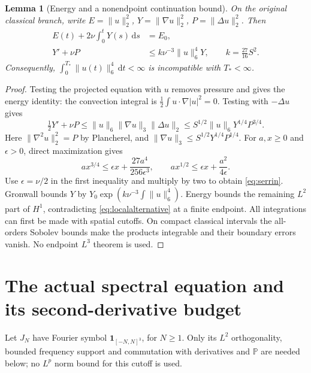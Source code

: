 \documentclass[11pt,a4paper]{article}
\newtheorem{lemma}[theorem]{Lemma}
\theoremstyle{definition}\newtheorem{definition}[theorem]{Definition}
\theoremstyle{remark}\newtheorem{remark}[theorem]{Remark}
\newcommand{\PP}{\mathbb P}
\newcommand{\dd}{\,\mathrm d}
\newcommand{\norm}[1]{\lVert #1\rVert}
\numberwithin{equation}{section}
\begin{document}
\begin{lemma}[Energy and a nonendpoint continuation bound]\label{lem:energyserrin}
On the original classical branch, write $E=\norm u_2^2$, $Y=\norm{\nabla u}_2^2$, $P=\norm{\Delta u}_2^2$. Then
\begin{align}
 E(t)+2\nu\int_0^tY(s)\dd s&=E_0,\label{eq:energy}\\
 Y'+\nu P&\le k\nu^{-3}\norm u_6^4Y,
 \qquad k=\frac{27}{16}S^2.\label{eq:serrin}
\end{align}
Consequently, $\int_0^{T_*}\norm{u(t)}_6^4\dd t<\infty$ is incompatible with $T_*<\infty$.
\end{lemma}
\begin{proof}
Testing the projected equation with $u$ removes pressure and gives the energy identity: the convection integral is $\frac12\int u\cdot\nabla|u|^2=0$. Testing with $-\Delta u$ gives
\[
 \tfrac12Y'+\nu P
 \le\norm u_6\norm{\nabla u}_3\norm{\Delta u}_2
 \le S^{1/2}\norm u_6Y^{1/4}P^{3/4}.
\]
Here $\norm{\nabla^2u}_2^2=P$ by Plancherel, and $\norm{\nabla u}_3\le S^{1/2}Y^{1/4}P^{1/4}$. For $a,x\ge0$ and $\epsilon>0$, direct maximization gives
\begin{equation}\label{eq:young}
 ax^{3/4}\le\epsilon x+\frac{27a^4}{256\epsilon^3},
 \qquad ax^{1/2}\le\epsilon x+\frac{a^2}{4\epsilon}.
\end{equation}
Use $\epsilon=\nu/2$ in the first inequality and multiply by two to obtain \eqref{eq:serrin}. Gronwall bounds $Y$ by $Y_0\exp(k\nu^{-3}\int\norm u_6^4)$. Energy bounds the remaining $L^2$ part of $H^1$, contradicting \eqref{eq:localalternative} at a finite endpoint. All integrations can first be made with spatial cutoffs. On compact classical intervals the all-orders Sobolev bounds make the products integrable and their boundary errors vanish. No endpoint $L^3$ theorem is used.
\end{proof}

\section{The actual spectral equation and its second-derivative budget}
\label{sec:second}
Let $J_N$ have Fourier symbol $\mathbf1_{[-N,N]^3}$, for $N\ge1$. Only its $L^2$ orthogonality, bounded frequency support and commutation with derivatives and $\PP$ are needed below; no $L^p$ norm bound for this cutoff is used.
\end{document}
